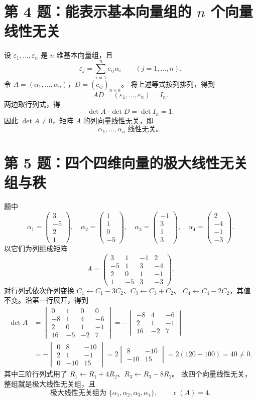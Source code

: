 \documentclass[11pt,a4paper,fontset=fandol]{ctexart}
\newcommand{\problem}[1]{\Needspace{6\baselineskip}\section*{#1}}
\newcommand{\ans}[1]{\boxed{#1}}
\newcommand{\rank}{\operatorname{r}}
\begin{document}
\newpage
\problem{第 4 题：能表示基本向量组的 $n$ 个向量线性无关}
设 $\varepsilon_1,\ldots,\varepsilon_n$ 是 $n$ 维基本向量组，且
\[
\varepsilon_j=\sum_{i=1}^n c_{ij}\alpha_i\qquad(j=1,\ldots,n).
\]
令 $A=(\alpha_1,\ldots,\alpha_n)$，$D=(c_{ij})_{n\times n}$。
将上述等式按列排列，得到
\[
AD=(\varepsilon_1,\ldots,\varepsilon_n)=I_n.
\]
两边取行列式，得
\[
\det A\cdot\det D=\det I_n=1.
\]
因此 $\det A\ne0$，矩阵 $A$ 的列向量线性无关，即
\[
\ans{\alpha_1,\ldots,\alpha_n\text{ 线性无关。}}
\]

\problem{第 5 题：四个四维向量的极大线性无关组与秩}
题中
\[
\alpha_1=\begin{pmatrix}3\\-5\\2\\1\end{pmatrix},\quad
\alpha_2=\begin{pmatrix}1\\1\\0\\-5\end{pmatrix},\quad
\alpha_3=\begin{pmatrix}-1\\3\\1\\3\end{pmatrix},\quad
\alpha_4=\begin{pmatrix}2\\-4\\-1\\-3\end{pmatrix}.
\]
以它们为列组成矩阵
\[
A=\begin{pmatrix}
3&1&-1&2\\
-5&1&3&-4\\
2&0&1&-1\\
1&-5&3&-3
\end{pmatrix}.
\]
对行列式依次作列变换
$C_1\leftarrow C_1-3C_2$、$C_3\leftarrow C_3+C_2$、
$C_4\leftarrow C_4-2C_2$，其值不变。沿第一行展开，得到
\[
\begin{aligned}
\det A
&=\begin{vmatrix}
0&1&0&0\\-8&1&4&-6\\2&0&1&-1\\16&-5&-2&7
\end{vmatrix}
=-\begin{vmatrix}-8&4&-6\\2&1&-1\\16&-2&7\end{vmatrix}\\[2pt]
&=-\begin{vmatrix}0&8&-10\\2&1&-1\\0&-10&15\end{vmatrix}
=2\begin{vmatrix}8&-10\\-10&15\end{vmatrix}
=2(120-100)=40\ne0.
\end{aligned}
\]
其中三阶行列式用了
$R_1\leftarrow R_1+4R_2$、$R_3\leftarrow R_3-8R_2$。
故四个向量线性无关，整组就是极大线性无关组，且
\[
\ans{\text{极大线性无关组为 }\{\alpha_1,\alpha_2,\alpha_3,\alpha_4\},
\qquad \rank(A)=4.}
\]
\end{document}
